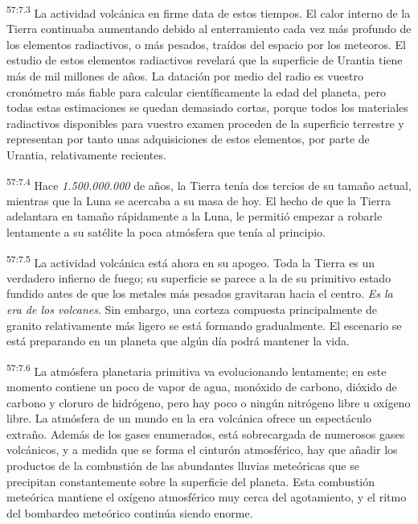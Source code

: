 \par
\textsuperscript{57:7.3} La actividad volcánica en firme data de estos tiempos. El calor interno de la Tierra continuaba aumentando debido al enterramiento cada vez más profundo de los elementos radiactivos, o más pesados, traídos del espacio por los meteoros. El estudio de estos elementos radiactivos revelará que la superficie de Urantia tiene más de mil millones de años. La datación por medio del radio es vuestro cronómetro más fiable para calcular científicamente la edad del planeta, pero todas estas estimaciones se quedan demasiado cortas, porque todos los materiales radiactivos disponibles para vuestro examen proceden de la superficie terrestre y representan por tanto unas adquisiciones de estos elementos, por parte de Urantia, relativamente recientes.

\par
\textsuperscript{57:7.4} Hace \textit{1.500.000.000} de años, la Tierra tenía dos tercios de su tamaño actual, mientras que la Luna se acercaba a su masa de hoy. El hecho de que la Tierra adelantara en tamaño rápidamente a la Luna, le permitió empezar a robarle lentamente a su satélite la poca atmósfera que tenía al principio.

\par
\textsuperscript{57:7.5} La actividad volcánica está ahora en su apogeo. Toda la Tierra es un verdadero infierno de fuego; su superficie se parece a la de su primitivo estado fundido antes de que los metales más pesados gravitaran hacia el centro. \textit{Es la era de los volcanes}. Sin embargo, una corteza compuesta principalmente de granito relativamente más ligero se está formando gradualmente. El escenario se está preparando en un planeta que algún día podrá mantener la vida.

\par
\textsuperscript{57:7.6} La atmósfera planetaria primitiva va evolucionando lentamente; en este momento contiene un poco de vapor de agua, monóxido de carbono, dióxido de carbono y cloruro de hidrógeno, pero hay poco o ningún nitrógeno libre u oxígeno libre. La atmósfera de un mundo en la era volcánica ofrece un espectáculo extraño. Además de los gases enumerados, está sobrecargada de numerosos gases volcánicos, y a medida que se forma el cinturón atmosférico, hay que añadir los productos de la combustión de las abundantes lluvias meteóricas que se precipitan constantemente sobre la superficie del planeta. Esta combustión meteórica mantiene el oxígeno atmosférico muy cerca del agotamiento, y el ritmo del bombardeo meteórico continúa siendo enorme.

